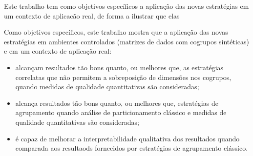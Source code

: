 \documentclass[
    12pt,                %
    oneside,            %
    a4paper,            %
    english,            %
    brazil                %
    ]{abntex2ppgsi}
\begin{document}

Este trabalho tem como objetivos específicos a aplicação das novas estratégias em um contexto de aplicacão real, de forma a ilustrar que elas

Como objetivos específicos, este trabalho mostra que a aplicação das novas estratégias em ambientes controlados (matrizes de dados com cogrupos sintéticas) e em um contexto de aplicação real:

\begin{itemize}
    \item alcançam resultados tão bons quanto, ou melhores que, as estratégias correlatas que não permitem a sobreposição de dimensões nos cogrupos, quando medidas de qualidade quantitativas são consideradas;
    \item alcança resultados tão bons quanto, ou melhores que, estratégias de agrupamento quando análise de particionamento clássico e medidas de qualidade quantitativas são consideradas;
    \item é capaz de melhorar a interpretabilidade qualitativa dos resultados quando comparada aos resultaods fornecidos por estratégias de agrupamento clássico.
\end{itemize}






\end{document}
